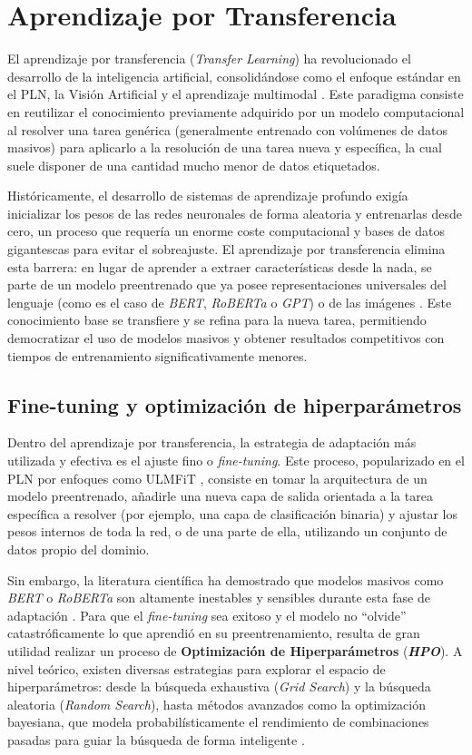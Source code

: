 \section{Aprendizaje por Transferencia}
\label{sec:TransferLearning}
El aprendizaje por transferencia (\textit{Transfer Learning}) ha revolucionado el desarrollo de la inteligencia artificial, consolidándose como el enfoque estándar en el PLN, la Visión Artificial y el aprendizaje multimodal \cite{pan2009survey}. Este paradigma consiste en reutilizar el conocimiento previamente adquirido por un modelo computacional al resolver una tarea genérica (generalmente entrenado con volúmenes de datos masivos) para aplicarlo a la resolución de una tarea nueva y específica, la cual suele disponer de una cantidad mucho menor de datos etiquetados. 

Históricamente, el desarrollo de sistemas de aprendizaje profundo exigía inicializar los pesos de las redes neuronales de forma aleatoria y entrenarlas desde cero, un proceso que requería un enorme coste computacional y bases de datos gigantescas para evitar el sobreajuste. El aprendizaje por transferencia elimina esta barrera: en lugar de aprender a extraer características desde la nada, se parte de un modelo preentrenado que ya posee representaciones universales del lenguaje (como es el caso de \textit{BERT}, \textit{RoBERTa} o \textit{GPT}) o de las imágenes \cite{qiu2020pre}. Este conocimiento base se transfiere y se refina para la nueva tarea, permitiendo democratizar el uso de modelos masivos y obtener resultados competitivos con tiempos de entrenamiento significativamente menores. 

\subsection{Fine-tuning y optimización de hiperparámetros}
\label{subsec:FineTuning}
Dentro del aprendizaje por transferencia, la estrategia de adaptación más utilizada y efectiva es el ajuste fino o \textit{fine-tuning}. Este proceso, popularizado en el PLN por enfoques como ULMFiT \cite{howard2018universal}, consiste en tomar la arquitectura de un modelo preentrenado, añadirle una nueva capa de salida orientada a la tarea específica a resolver (por ejemplo, una capa de clasificación binaria) y ajustar los pesos internos de toda la red, o de una parte de ella, utilizando un conjunto de datos propio del dominio.

Sin embargo, la literatura científica ha demostrado que modelos masivos como \textit{BERT} o \textit{RoBERTa} son altamente inestables y sensibles durante esta fase de adaptación \cite{dodge2020fine}. Para que el \textit{fine-tuning} sea exitoso y el modelo no ``olvide'' catastróficamente lo que aprendió en su preentrenamiento, resulta de gran utilidad realizar un proceso de \textbf{Optimización de Hiperparámetros} (\textbf{\textit{HPO}}). A nivel teórico, existen diversas estrategias para explorar el espacio de hiperparámetros: desde la búsqueda exhaustiva (\textit{Grid Search}) y la búsqueda aleatoria (\textit{Random Search}), hasta métodos avanzados como la optimización bayesiana, que modela probabilísticamente  el rendimiento de combinaciones pasadas para guiar la búsqueda de forma inteligente \cite{akiba2019optuna}.

